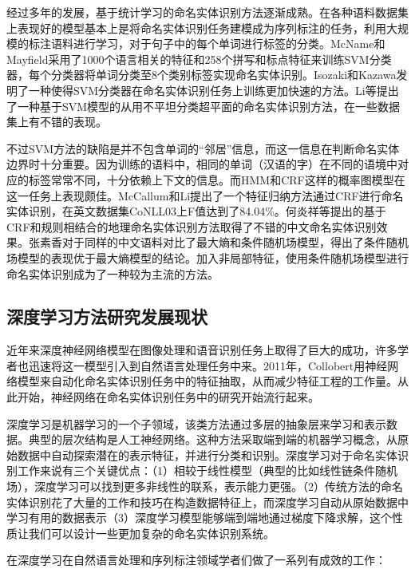 \documentclass[winfonts,master,oneside,nobackinfo]{njuthesis}
\begin{document}
经过多年的发展，基于统计学习的命名实体识别方法逐渐成熟。在各种语料数据集上表现好的模型基本上是将命名实体识别任务建模成为序列标注的任务，利用大规模的标注语料进行学习，对于句子中的每个单词进行标签的分类。McName和Mayfield\cite{McName}采用了1000个语言相关的特征和258个拼写和标点特征来训练SVM分类器，每个分类器将单词分类至8个类别标签实现命名实体识别。Isozaki和Kazawa\cite{Isozki}发明了一种使得SVM分类器在命名实体识别任务上训练更加快速的方法。Li\cite{Li}等提出了一种基于SVM模型的从用不平坦分类超平面的命名实体识别方法，在一些数据集上有不错的表现。

不过SVM方法的缺陷是并不包含单词的“邻居”信息，而这一信息在判断命名实体边界时十分重要。因为训练的语料中，相同的单词（汉语的字）在不同的语境中对应的标签常常不同，十分依赖上下文的信息。而HMM和CRF这样的概率图模型在这一任务上表现颇佳。McCallum和Li\cite{McCallum}提出了一个特征归纳方法通过CRF进行命名实体识别，在英文数据集CoNLL03上F值达到了84.04\%。何炎祥\cite{hyx}等提出的基于CRF和规则相结合的地理命名实体识别方法取得了不错的中文命名实体识别效果。张素香\cite{zsx}对于同样的中文语料对比了最大熵和条件随机场模型，得出了条件随机场模型的表现优于最大熵模型的结论。加入非局部特征，使用条件随机场模型进行命名实体识别成为了一种较为主流的方法。

\subsection{深度学习方法研究发展现状}
近年来深度神经网络模型在图像处理和语音识别任务上取得了巨大的成功，许多学者也迅速将这一模型引入到自然语言处理任务中来。2011年，Collobert\cite{Collobert}用神经网络模型来自动化命名实体识别任务中的特征抽取，从而减少特征工程的工作量。从此开始，神经网络在命名实体识别任务中的研究开始流行起来。

深度学习是机器学习的一个子领域，该类方法通过多层的抽象层来学习和表示数据。典型的层次结构是人工神经网络。这种方法采取端到端的机器学习概念，从原始数据中自动探索潜在的表示特征，并进行分类和识别。深度学习对于命名实体识别工作来说有三个关键优点：（1）相较于线性模型（典型的比如线性链条件随机场），深度学习可以找到更多非线性的联系，表示能力更强。（2）传统方法的命名实体识别花了大量的工作和技巧在构造数据特征上，而深度学习自动从原始数据中学习有用的数据表示（3）深度学习模型能够端到端地通过梯度下降求解，这个性质让我们可以设计一些更加复杂的命名实体识别系统。

在深度学习在自然语言处理和序列标注领域学者们做了一系列有成效的工作：
\end{document}
